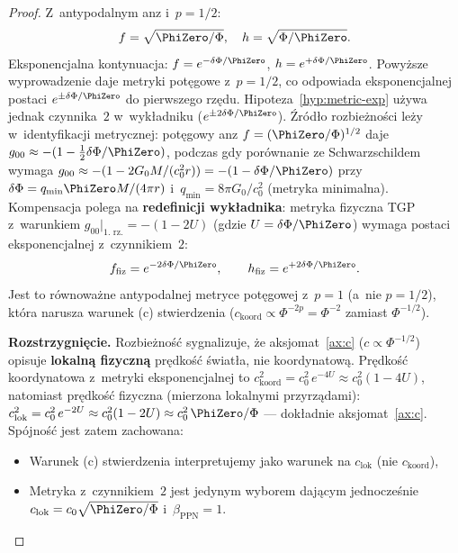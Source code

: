 \begin{proof}
\medskip
Z~antypodalnym anz i~$p = 1/2$:
\[
  f = \sqrt{\PhiZero/\Phi}, \quad h = \sqrt{\Phi/\PhiZero}.
\]
Eksponencjalna kontynuacja:
$f = e^{-\delta\Phi/\PhiZero}$,
$h = e^{+\delta\Phi/\PhiZero}$.
Powy\.zsze wyprowadzenie daje metryki pot\k{e}gowe z~$p = 1/2$,
co odpowiada eksponencjalnej postaci $e^{\pm\delta\Phi/\PhiZero}$
do pierwszego rz\k{e}du. Hipoteza~\ref{hyp:metric-exp}
u\.zywa jednak czynnika~$2$ w~wyk\l{}adniku
($e^{\pm 2\delta\Phi/\PhiZero}$). \'Zr\'od\l{}o rozbie\.zno\'sci
le\.zy w~identyfikacji metrycznej: pot\k{e}gowy anz
$f = (\PhiZero/\Phi)^{1/2}$ daje
$g_{00} \approx -(1 - \tfrac{1}{2}\delta\Phi/\PhiZero)$,
podczas gdy por\'ownanie ze Schwarzschildem wymaga
$g_{00} \approx -(1 - 2G_0 M/(c_0^2 r))
= -(1 - \delta\Phi/\PhiZero)$ przy $\delta\Phi = q_{\mathrm{min}}\PhiZero M/(4\pi r)$
i~$q_{\mathrm{min}} = 8\pi G_0/c_0^2$ (metryka minimalna). Kompensacja polega na
\textbf{redefinicji wyk\l{}adnika}: metryka fizyczna TGP
z~warunkiem $g_{00}|_{\text{1.\ rz.}} = -(1 - 2U)$
(gdzie $U = \delta\Phi/\PhiZero$) wymaga postaci
eksponencjalnej z~czynnikiem~$2$:
\begin{equation}\label{eq:metric-factor2}
  f_{\mathrm{fiz}} = e^{-2\delta\Phi/\PhiZero}, \qquad
  h_{\mathrm{fiz}} = e^{+2\delta\Phi/\PhiZero}.
\end{equation}
Jest to r\'ownowa\.zne antypodalnej metryce pot\k{e}gowej
z~$p = 1$ (a~nie $p = 1/2$), kt\'ora narusza warunek (c)
stwierdzenia ($c_{\mathrm{koord}} \propto \Phi^{-2p}
= \Phi^{-2}$ zamiast $\Phi^{-1/2}$).

\medskip\noindent\textbf{Rozstrzygni\k{e}cie.}
Rozbie\.zno\'s\'c sygnalizuje, \.ze aksjomat~\ref{ax:c}
($c \propto \Phi^{-1/2}$) opisuje \textbf{lokaln\k{a}
fizyczn\k{a}} pr\k{e}dko\'s\'c \'swiat\l{}a, nie
koordynatow\k{a}. Pr\k{e}dko\'s\'c koordynatowa
z~metryki eksponencjalnej to
$c_{\mathrm{koord}}^2 = c_0^2\,e^{-4U} \approx c_0^2(1-4U)$,
natomiast pr\k{e}dko\'s\'c fizyczna (mierzona lokalnymi
przyrz\k{a}dami):
$c_{\mathrm{lok}}^2 = c_0^2\,e^{-2U} \approx c_0^2(1-2U)
\approx c_0^2\,\PhiZero/\Phi$ --- dok\l{}adnie
aksjomat~\ref{ax:c}. Sp\'ojno\'s\'c jest zatem zachowana:
\begin{itemize}[nosep]
  \item Warunek (c) stwierdzenia interpretujemy jako
    warunek na $c_{\mathrm{lok}}$ (nie $c_{\mathrm{koord}}$),
  \item Metryka z~czynnikiem~$2$ jest jedynym wyborem
    daj\k{a}cym jednocze\'snie $c_{\mathrm{lok}}
    = c_0\sqrt{\PhiZero/\Phi}$ i~$\beta_{\mathrm{PPN}} = 1$.
\end{itemize}
\end{proof}

